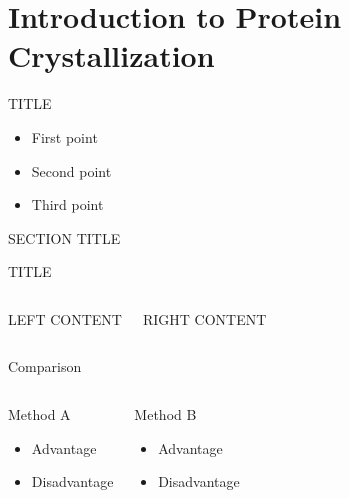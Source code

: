 \section{Introduction to Protein Crystallization}

\begin{frame}{TITLE}
    \begin{itemize}
        \item First point
        \item Second point
        \item Third point
    \end{itemize}
\end{frame}

\begin{frame}
    \centering
    \vfill
    {\Huge SECTION TITLE}
    \vfill
\end{frame}

\begin{frame}{TITLE}
    \begin{columns}[T]
        LEFT CONTENT

        RIGHT CONTENT
    \end{columns}
\end{frame}

\begin{frame}{Comparison}
    \begin{columns}[T]
        \begin{block}{Method A}
            \begin{itemize}
                \item Advantage
                \item Disadvantage
            \end{itemize}
        \end{block}

        \begin{block}{Method B}
            \begin{itemize}
                \item Advantage
                \item Disadvantage
            \end{itemize}
        \end{block}
    \end{columns}
\end{frame}

